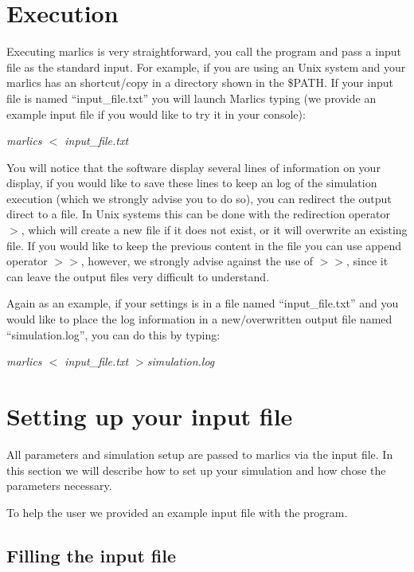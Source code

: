 \documentclass{article}
\newcommand{\consoleline}[2][0.5cm]
{\vspace{#1}
\textit{{#2}}
\vspace{#1}
}
\begin{document}
\section{Execution}

Executing marlics is very straightforward, you call the program and pass a input file as the standard input. For example, if you are using an Unix system and your marlics has an shortcut/copy in a directory shown in the \$PATH. If your input file is named ``input\_file.txt'' you will launch Marlics typing (we provide an example input file if you would like to try it in your console):


\consoleline{marlics $<$ input\_file.txt}



You will notice that the software display several lines of information on your display, if you would like to save these lines to keep an log of the simulation execution (which we strongly advise you to do so), you can redirect the output direct to a file. In Unix systems this can be done with the redirection operator $>$, which will create a new file if it does not exist, or it will overwrite an existing file. If you would like to keep the previous content in the file you can use append operator $>>$, however, we strongly advise against the use of $>>$, since it can leave the output files very difficult to understand.

Again as an example, if your settings is in a file named ``input\_file.txt'' and you would like to place the log information in a new$/$overwritten  output file named ``simulation.log'', you can do this by typing:

\consoleline{marlics $<$ input\_file.txt $>$simulation.log}

\section{Setting up your input file}

All parameters and simulation setup are passed  to marlics via the input file. In this section we will describe how to set up your simulation and how chose the parameters necessary.

To help the user we provided an example input file with the program.

\subsection{Filling the input file}
\end{document}

